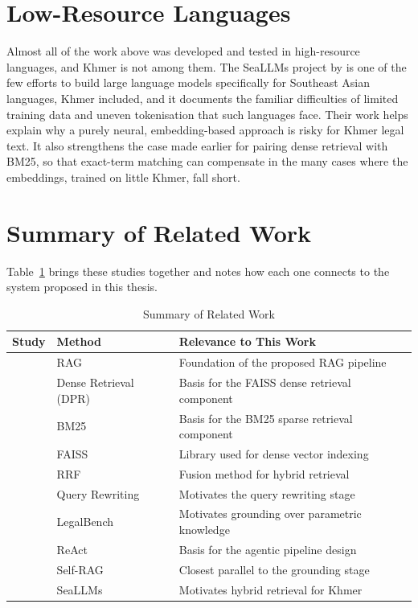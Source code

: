 \section{Low-Resource Languages}

\hs Almost all of the work above was developed and tested in high-resource languages, and
Khmer is not among them. The SeaLLMs project by \citet{nguyen2023seallms} is one of the
few efforts to build large language models specifically for Southeast Asian languages,
Khmer included, and it documents the familiar difficulties of limited training data and
uneven tokenisation that such languages face. Their work helps explain why a purely
neural, embedding-based approach is risky for Khmer legal text. It also strengthens the
case made earlier for pairing dense retrieval with BM25, so that exact-term matching can
compensate in the many cases where the embeddings, trained on little Khmer, fall short.

\section{Summary of Related Work}

\hs Table~\ref{tab:literature_summary} brings these studies together and notes how each
one connects to the system proposed in this thesis.

\begin{table}[H]
\centering
\caption{Summary of Related Work}
\label{tab:literature_summary}
\begin{tabular}{p{4cm} p{3.5cm} p{6cm}}
\hline
\textbf{Study} & \textbf{Method} & \textbf{Relevance to This Work} \\
\hline
\citet{lewis2020rag} & RAG &
Foundation of the proposed RAG pipeline \\
\hline
\citet{karpukhin2020dpr} & Dense Retrieval (DPR) &
Basis for the FAISS dense retrieval component \\
\hline
\citet{robertson2009bm25} & BM25 &
Basis for the BM25 sparse retrieval component \\
\hline
\citet{johnson2021faiss} & FAISS &
Library used for dense vector indexing \\
\hline
\citet{cormack2009rrf} & RRF &
Fusion method for hybrid retrieval \\
\hline
\citet{ma2023queryrewriting} & Query Rewriting &
Motivates the query rewriting stage \\
\hline
\citet{guha2023legalbench} & LegalBench &
Motivates grounding over parametric knowledge \\
\hline
\citet{yao2023react} & ReAct &
Basis for the agentic pipeline design \\
\hline
\citet{asai2024selfrag} & Self-RAG &
Closest parallel to the grounding stage \\
\hline
\citet{nguyen2023seallms} & SeaLLMs &
Motivates hybrid retrieval for Khmer \\
\hline
\end{tabular}
\end{table}
